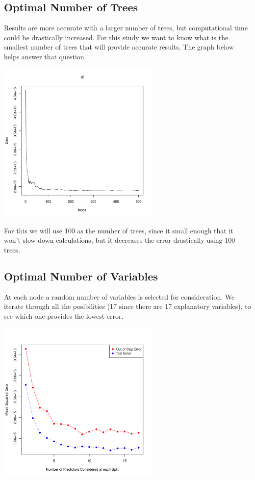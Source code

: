 \documentclass{svproc}
\begin{document}
\subsection{Optimal Number of Trees}

Results are more accurate with a larger number of trees, but computational time could be drastically increased. For this study we want to know what is the smallest number of trees that will provide accurate results. The graph below helps answer that question. 

\begin{center}
\includegraphics [height=8cm]{optim_trees.pdf}
\end{center}

For this we will use 100 as the number of trees, since it small enough that it won't slow down calculations, but it decreases the error drastically using 100 trees.

\subsection{Optimal Number of Variables}

At each node a random number of variables is selected for consideration. We iterate through all the posibilities (17 since there are 17 explanatory variables), to see which one provides the lowest error.

\begin{center}
\includegraphics [height=8cm]{mtry.pdf}
\end{center}
\end{document}
